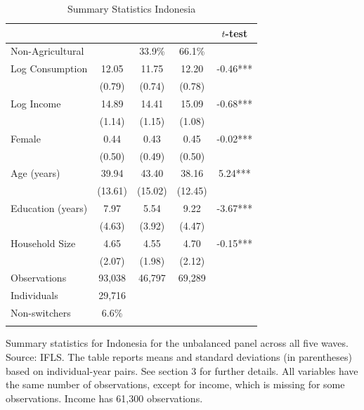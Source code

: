 \begin{table}[htbp] \centering \caption{Summary Statistics Indonesia}\label{tab:summary_stats_IDN_unb_nonag} \begin{threeparttable} \begin{tabular}{l cccc} \toprule
 &  &  &  & $t$-test \\
\midrule
Non-Agricultural &  &   33.9\% &   66.1\% &  \\  \addlinespace \addlinespace
Log Consumption & 12.05 & 11.75 & 12.20 & -0.46*** \\
 & (0.79) & (0.74) & (0.78) &  \\  \addlinespace
Log Income & 14.89 & 14.41 & 15.09 & -0.68*** \\
 & (1.14) & (1.15) & (1.08) &  \\  \addlinespace
Female & 0.44 & 0.43 & 0.45 & -0.02*** \\
 & (0.50) & (0.49) & (0.50) &  \\  \addlinespace
Age (years) & 39.94 & 43.40 & 38.16 & 5.24*** \\
 & (13.61) & (15.02) & (12.45) &  \\  \addlinespace
Education (years) & 7.97 & 5.54 & 9.22 & -3.67*** \\
 & (4.63) & (3.92) & (4.47) &  \\  \addlinespace
Household Size & 4.65 & 4.55 & 4.70 & -0.15*** \\
 & (2.07) & (1.98) & (2.12) &  \\  \addlinespace


\cmidrule{2-5}
Observations & 93,038 & 46,797 & 69,289 &  \\  \addlinespace
Individuals & 29,716 &  &  &  \\
Non-switchers &    6.6\% &  &  &  \\  \addlinespace
\bottomrule \end{tabular} \begin{tablenotes}[flushleft] \footnotesize \item{Summary statistics for Indonesia for the unbalanced panel across all five waves. Source: IFLS. The table reports means and standard deviations (in parentheses) based on individual-year pairs. See section 3 for further details. All variables have the same number of observations, except for income, which is missing for some observations. Income has 61,300 observations.} \end{tablenotes} \end{threeparttable} \end{table}
